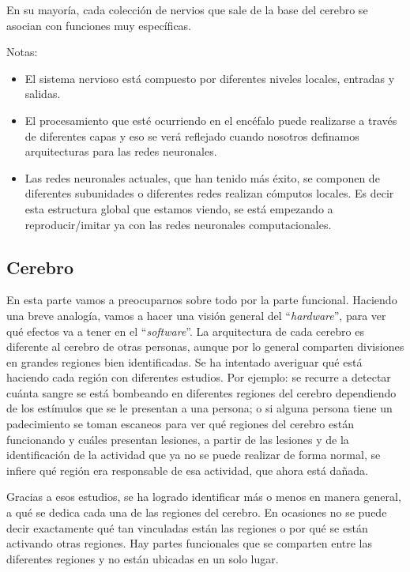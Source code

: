  En su mayoría, cada colección de nervios que sale de la base del cerebro se asocian con funciones muy específicas.
 
 Notas:
 
 \begin{itemize}
  \item El sistema nervioso está compuesto por diferentes niveles locales, entradas y salidas.
  
  \item El procesamiento que esté ocurriendo en el encéfalo puede realizarse a través de diferentes capas y eso se verá reflejado cuando nosotros definamos arquitecturas para las redes neuronales.
  
  \item Las redes neuronales actuales, que han tenido más éxito, se componen de diferentes subunidades o diferentes redes realizan cómputos locales. Es decir esta estructura global que estamos viendo,  se está empezando a reproducir/imitar ya con las redes neuronales computacionales.


 \end{itemize}




\subsection{Cerebro}


En esta parte vamos a preocuparnos sobre todo por la parte funcional. Haciendo una breve analogía, vamos a hacer una visión general del ``\textit{hardware}'', para ver qué efectos va a tener en el ``\textit{software}''.
La arquitectura de cada cerebro es diferente al cerebro de otras personas, aunque por lo general comparten divisiones en grandes regiones bien identificadas. Se ha intentado averiguar qué está haciendo cada región con diferentes estudios.  Por ejemplo: se recurre a detectar cuánta sangre se está bombeando en diferentes regiones del cerebro dependiendo de los estímulos que se le presentan a una persona; o si alguna persona tiene un padecimiento se toman escaneos para ver qué regiones del cerebro están funcionando y cuáles presentan lesiones, a partir de las lesiones y de la identificación de la actividad que ya no se puede realizar de forma normal, se infiere qué región era responsable de esa actividad, que ahora está dañada.


Gracias a esos estudios, se ha logrado identificar más o menos en manera general, a qué se dedica cada una de las regiones del cerebro. En ocasiones no se puede decir exactamente qué tan vinculadas están las regiones o por qué se están activando otras regiones.  Hay partes funcionales que se comparten entre las diferentes regiones y no están ubicadas en un solo lugar. 


